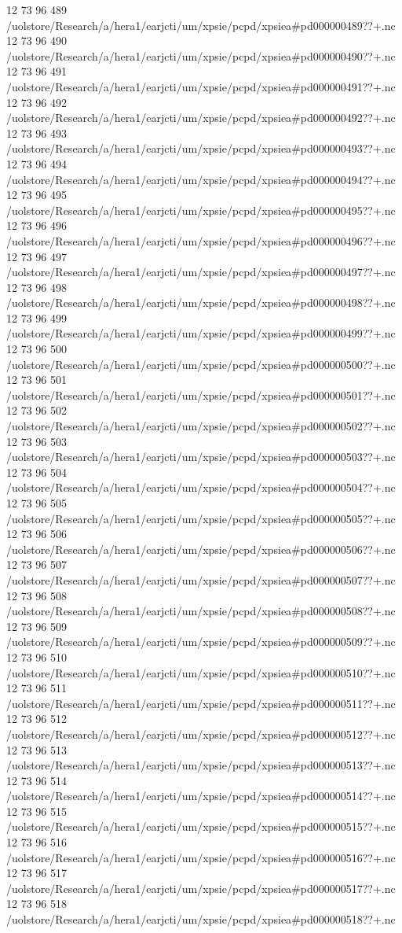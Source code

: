 12 73 96
489
/uolstore/Research/a/hera1/earjcti/um/xpsie/pcpd/xpsiea#pd000000489??+.nc
12 73 96
490
/uolstore/Research/a/hera1/earjcti/um/xpsie/pcpd/xpsiea#pd000000490??+.nc
12 73 96
491
/uolstore/Research/a/hera1/earjcti/um/xpsie/pcpd/xpsiea#pd000000491??+.nc
12 73 96
492
/uolstore/Research/a/hera1/earjcti/um/xpsie/pcpd/xpsiea#pd000000492??+.nc
12 73 96
493
/uolstore/Research/a/hera1/earjcti/um/xpsie/pcpd/xpsiea#pd000000493??+.nc
12 73 96
494
/uolstore/Research/a/hera1/earjcti/um/xpsie/pcpd/xpsiea#pd000000494??+.nc
12 73 96
495
/uolstore/Research/a/hera1/earjcti/um/xpsie/pcpd/xpsiea#pd000000495??+.nc
12 73 96
496
/uolstore/Research/a/hera1/earjcti/um/xpsie/pcpd/xpsiea#pd000000496??+.nc
12 73 96
497
/uolstore/Research/a/hera1/earjcti/um/xpsie/pcpd/xpsiea#pd000000497??+.nc
12 73 96
498
/uolstore/Research/a/hera1/earjcti/um/xpsie/pcpd/xpsiea#pd000000498??+.nc
12 73 96
499
/uolstore/Research/a/hera1/earjcti/um/xpsie/pcpd/xpsiea#pd000000499??+.nc
12 73 96
500
/uolstore/Research/a/hera1/earjcti/um/xpsie/pcpd/xpsiea#pd000000500??+.nc
12 73 96
501
/uolstore/Research/a/hera1/earjcti/um/xpsie/pcpd/xpsiea#pd000000501??+.nc
12 73 96
502
/uolstore/Research/a/hera1/earjcti/um/xpsie/pcpd/xpsiea#pd000000502??+.nc
12 73 96
503
/uolstore/Research/a/hera1/earjcti/um/xpsie/pcpd/xpsiea#pd000000503??+.nc
12 73 96
504
/uolstore/Research/a/hera1/earjcti/um/xpsie/pcpd/xpsiea#pd000000504??+.nc
12 73 96
505
/uolstore/Research/a/hera1/earjcti/um/xpsie/pcpd/xpsiea#pd000000505??+.nc
12 73 96
506
/uolstore/Research/a/hera1/earjcti/um/xpsie/pcpd/xpsiea#pd000000506??+.nc
12 73 96
507
/uolstore/Research/a/hera1/earjcti/um/xpsie/pcpd/xpsiea#pd000000507??+.nc
12 73 96
508
/uolstore/Research/a/hera1/earjcti/um/xpsie/pcpd/xpsiea#pd000000508??+.nc
12 73 96
509
/uolstore/Research/a/hera1/earjcti/um/xpsie/pcpd/xpsiea#pd000000509??+.nc
12 73 96
510
/uolstore/Research/a/hera1/earjcti/um/xpsie/pcpd/xpsiea#pd000000510??+.nc
12 73 96
511
/uolstore/Research/a/hera1/earjcti/um/xpsie/pcpd/xpsiea#pd000000511??+.nc
12 73 96
512
/uolstore/Research/a/hera1/earjcti/um/xpsie/pcpd/xpsiea#pd000000512??+.nc
12 73 96
513
/uolstore/Research/a/hera1/earjcti/um/xpsie/pcpd/xpsiea#pd000000513??+.nc
12 73 96
514
/uolstore/Research/a/hera1/earjcti/um/xpsie/pcpd/xpsiea#pd000000514??+.nc
12 73 96
515
/uolstore/Research/a/hera1/earjcti/um/xpsie/pcpd/xpsiea#pd000000515??+.nc
12 73 96
516
/uolstore/Research/a/hera1/earjcti/um/xpsie/pcpd/xpsiea#pd000000516??+.nc
12 73 96
517
/uolstore/Research/a/hera1/earjcti/um/xpsie/pcpd/xpsiea#pd000000517??+.nc
12 73 96
518
/uolstore/Research/a/hera1/earjcti/um/xpsie/pcpd/xpsiea#pd000000518??+.nc
